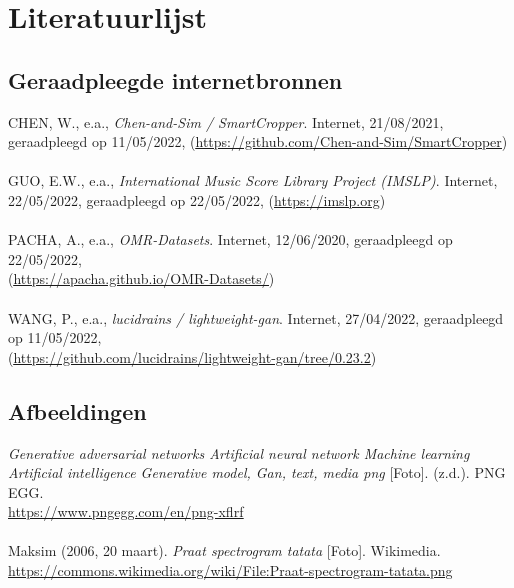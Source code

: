 \documentclass[dutch, twoside, a4paper, 10pt]{article}
\begin{document}
\begin{table}[H]
\begin{tabular}{c p{0.6\linewidth}}
    \end{tabular}
\end{table}
\section{Literatuurlijst}
\subsection{Geraadpleegde internetbronnen}
CHEN, W., e.a., \textit{Chen-and-Sim / SmartCropper}. Internet, 21/08/2021, geraadpleegd op 11/05/2022, (\underline{\url{https://github.com/Chen-and-Sim/SmartCropper}})\\
\\
GUO, E.W., e.a., \textit{International Music Score Library Project (IMSLP)}. Internet, 22/05/2022, geraadpleegd op 22/05/2022, (\underline{\url{https://imslp.org}})\\
\\
PACHA, A., e.a., \textit{OMR-Datasets}. Internet, 12/06/2020, geraadpleegd op 22/05/2022,\\ (\underline{\url{https://apacha.github.io/OMR-Datasets/}})\\
\\
WANG, P., e.a., \textit{lucidrains / lightweight-gan}. Internet, 27/04/2022, geraadpleegd op 11/05/2022,\\ (\underline{\url{https://github.com/lucidrains/lightweight-gan/tree/0.23.2}})
\subsection{Afbeeldingen}
\textit{Generative adversarial networks Artificial neural network Machine learning Artificial intelligence Generative model, Gan, text, media png} [Foto]. (z.d.). PNG EGG. \\ \underline{\url{https://www.pngegg.com/en/png-xflrf}}\\
\\
Maksim (2006, 20 maart). \textit{Praat spectrogram tatata} [Foto]. Wikimedia. \\ \underline{\url{https://commons.wikimedia.org/wiki/File:Praat-spectrogram-tatata.png}}
\end{document}
